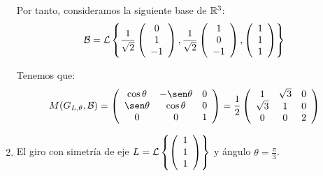\begin{ejercicio}
\begin{enumerate}
        Por tanto, consideramos la siguiente base de $\mathbb{R}^3$:
        \begin{equation*}
            \mathcal{B} = \mathcal{L}\left\{
            \frac{1}{\sqrt{2}} \left(\begin{array}{c}
                 0 \\ 1 \\ -1
            \end{array}\right),
            \frac{1}{\sqrt{2}}
            \left(\begin{array}{c}
                 1 \\ 0 \\ -1
            \end{array}\right),
            \left(\begin{array}{c}
                 1 \\ 1 \\ 1
            \end{array}\right)
            \right\}
        \end{equation*}

        Tenemos que:
        \begin{equation*}
            M(G_{L,\theta},\cc{B})=\left(\begin{array}{ccc}
                \cos \theta & -\sen \theta & 0 \\
                \sen \theta & \cos \theta & 0\\
                0& 0& 1
            \end{array}\right)
            = \frac{1}{2}\left(\begin{array}{ccc}
                1 & \sqrt{3} & 0 \\
                \sqrt{3} & 1 & 0\\
                0& 0& 2
            \end{array}\right)
        \end{equation*}

        \item El giro con simetría de eje $L=\mathcal{L}\left\{\left(\begin{array}{c}
                     1 \\ 1 \\ 1
                \end{array}\right)\right\}$ y ángulo $\displaystyle \theta=\frac{\pi}{3}$.
        

\end{enumerate}
\end{ejercicio}

